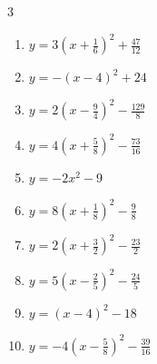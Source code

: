 \begin{multicols}{3}
\begin{enumerate}
  \item $\displaystyle y=3\left( x+\frac{1}{6}\right)^{2}+\frac{47}{12}$


  \item $\displaystyle y=-\left( x-4\right)^{2}+24$

        \phantom{$\displaystyle 頂点\left( 4 , 24 \right)$}

  \item $\displaystyle y=2\left( x-\frac{9}{4}\right)^{2}-\frac{129}{8}$


  \item $\displaystyle y=4\left( x+\frac{5}{8}\right)^{2}-\frac{73}{16}$


  \item $\displaystyle y=-2x^{2}-9$

        \phantom{$\displaystyle 頂点\left( 0 , -9 \right)$}

  \item $\displaystyle y=8\left( x+\frac{1}{8}\right)^{2}-\frac{9}{8}$


  \item $\displaystyle y=2\left( x+\frac{3}{2}\right)^{2}-\frac{23}{2}$


  \item $\displaystyle y=5\left( x-\frac{2}{5}\right)^{2}-\frac{24}{5}$


\columnbreak %

  \item $\displaystyle y=\left( x-4\right)^{2}-18$

        \phantom{$\displaystyle 頂点\left( 4 , -18 \right)$}

  \item $\displaystyle y=-4\left( x-\frac{5}{8}\right)^{2}-\frac{39}{16}$



\end{enumerate}
\end{multicols}
